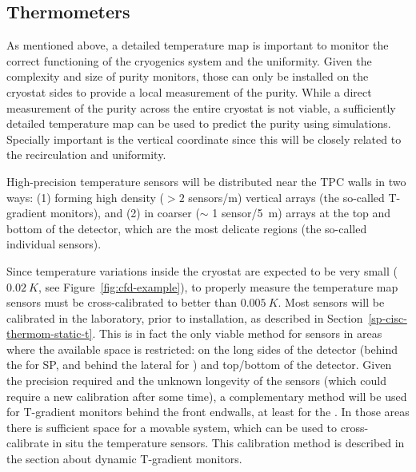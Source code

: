 \subsection{Thermometers}
\label{sec:fdgen-slow-cryo-therm}

As mentioned above, a detailed \threed temperature map is important to monitor the correct functioning of the cryogenics system and the \lar uniformity.
Given the complexity and size of purity monitors, those can only be installed on the cryostat sides to provide a local measurement of
the \lar purity. While a direct measurement of the \lar purity across the entire cryostat is not viable, a sufficiently detailed \threed temperature map
can be used to predict the \lar purity using  simulations. Specially important is the vertical coordinate since this will be closely related to
the \lar recirculation and uniformity. 

High-precision temperature sensors will be distributed near the TPC walls in two ways:
(1) forming high density (\(>2\) sensors/\si{m}) vertical arrays (the so-called T-gradient monitors), and (2) in coarser ($\sim$ 1 sensor/\SI{5}{m}) \twod arrays 
at the top and bottom of the detector, which are the most delicate regions (the so-called individual sensors).   

Since temperature variations inside the cryostat are expected to be very small ($\SI{0.02}{K}$, see Figure~\ref{fig:cfd-example}), to properly measure the \threed temperature map 
sensors must be cross-calibrated to better than $\SI{0.005}{K}$. Most sensors will be calibrated in the laboratory, prior to installation,
as described in Section~\ref{sp-cisc-thermom-static-t}.  This is in fact the only viable method for sensors in areas where the available space is restricted: on the long sides of the detector
(behind the  for SP, and behind the lateral %
 for \dual) and top/bottom of the detector.
Given the precision required and the unknown longevity of the sensors (which could require a new calibration after some time), a complementary method
will be used for T-gradient monitors behind the front endwalls, at least for the .
In those areas there is sufficient space for a movable system, which can be used to cross-calibrate in situ
the temperature sensors. This calibration method is described in the section about dynamic T-gradient monitors. 

